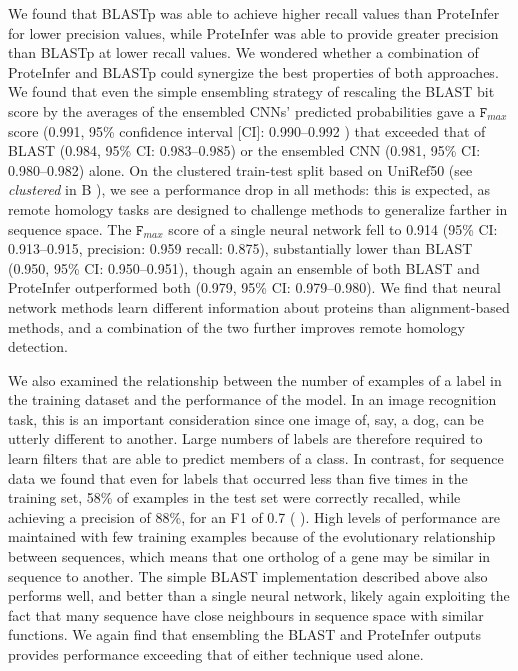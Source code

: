 We found that BLASTp was able to achieve higher recall values than ProteInfer for lower precision values, while ProteInfer was able to provide greater precision than BLASTp at lower recall values. We wondered whether a combination of ProteInfer and BLASTp could synergize the best properties of both approaches. We found that even the simple ensembling strategy of rescaling the BLAST bit score by the averages of the ensembled CNNs' predicted probabilities gave a $\texttt{F}_{max}$ score (0.991, 95\% confidence interval [CI]: 0.990--0.992 ) that exceeded that of BLAST (0.984, 95\% CI: 0.983--0.985) or the ensembled CNN (0.981, 95\% CI: 0.980--0.982) alone. 
On the clustered train-test split based on UniRef50 (see \textit{clustered} in B%
), we see a performance drop in all methods: this is expected, as remote homology tasks are designed to challenge methods to generalize farther in sequence space. The $\texttt{F}_{max}$ score of a single neural network fell to 0.914 (95\% CI: 0.913--0.915, precision: 0.959 recall: 0.875), substantially lower than BLAST (0.950, 95\% CI: 0.950--0.951), though again an ensemble of both BLAST and ProteInfer outperformed both (0.979, 95\% CI: 0.979--0.980). We find that neural network methods learn different information about proteins than alignment-based methods, and a combination of the two further improves remote homology detection. 

We also examined the relationship between the number of examples of a label in the training dataset and the performance of the model. In an image recognition task, this is an important consideration since one image of, say, a dog, can be utterly different to another. Large numbers of labels are therefore required to learn filters that are able to predict members of a class. In contrast, for sequence data we found that even for labels that occurred less than five times in the training set, 58\% of examples in the test set were correctly recalled, while achieving a precision of 88\%, for an F1 of 0.7 (%
). High levels of performance are maintained with few training examples because of the evolutionary relationship between sequences, which means that one ortholog of a gene may be similar in sequence to another. The simple BLAST implementation described above also performs well, and better than a single neural network, likely again exploiting the fact that many sequence have close neighbours in sequence space with similar functions. We again find that ensembling the BLAST and ProteInfer outputs provides performance exceeding that of either technique used alone.
